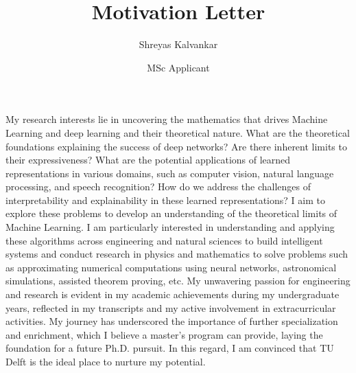 \documentclass{article}
\title{Motivation Letter}
\author{Shreyas Kalvankar}
\date{MSc Applicant}
\begin{document}
  \maketitle%
  \thispagestyle{empty}

\vspace{5pt}
\hspace{0.25in}My research interests lie in uncovering the mathematics that
drives Machine Learning and deep learning and their theoretical nature. What are
the theoretical foundations explaining the success of deep networks? Are there
inherent limits to their expressiveness? What are the potential applications of
learned representations in various domains, such as computer vision, natural
language processing, and speech recognition? How do we address the challenges of
interpretability and explainability in these learned representations? I aim to
explore these problems to develop an understanding of the theoretical limits of
Machine Learning. I am particularly interested in understanding and applying
these algorithms across engineering and natural sciences to build intelligent
systems and conduct research in physics and mathematics to solve problems such
as approximating numerical computations using neural networks, astronomical
simulations, assisted theorem proving, etc. My unwavering passion for
engineering and research is evident in my academic achievements during my
undergraduate years, reflected in my transcripts and my active involvement in
extracurricular activities. My journey has underscored the importance of further
specialization and enrichment, which I believe a master's program can provide,
laying the foundation for a future Ph.D. pursuit. In this regard, I am convinced
that TU Delft is the ideal place to nurture my potential.
\end{document}
